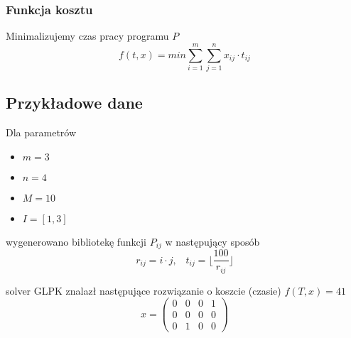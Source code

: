 \subsubsection{Funkcja kosztu}
Minimalizujemy czas pracy programu $P$
$$ f(t, x) = \textit{min} \sum_{i=1}^{m} \sum_{j=1}^{n} x_{ij} \cdot t_{ij} $$

\subsection{Przykładowe dane}
Dla parametrów
\begin{itemize}
    \item $m=3$
    \item $n=4$
    \item $M=10$
    \item $I = [1, 3]$ 
\end{itemize}
wygenerowano bibliotekę funkcji $P_{ij}$ w następujący sposób
$$ r_{ij} = i \cdot j, \hspace{10pt} t_{ij} = \Biggl\lfloor \frac{100}{r_{ij}} \Biggr\rfloor $$

solver GLPK znalazł następujące rozwiązanie o koszcie (czasie) $f(T, x) = 41$
$$ x = \left( \begin{matrix} 0 & 0 & 0 & 1 \\ 0 & 0 & 0 & 0 \\ 0 & 1 & 0 & 0 \end{matrix} \right) $$